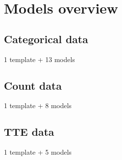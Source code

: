 \section{Models overview}
\label{sec:modelOverview}

\subsection{Categorical data}
1 template + 13 models

\subsection{Count data}
1 template + 8 models

\subsection{TTE data}
1 template + 5 models



%
